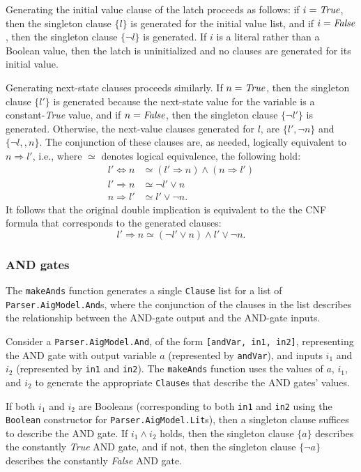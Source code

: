 \documentclass[12pt,a4paper,twoside,openright]{report}
\begin{document}
{Generating the initial value clause of the latch proceeds as follows: if $i = {\it True}$,
then the singleton clause $\{l\}$ is generated for the initial value list, and if $i = {\it False}$,
then the singleton clause $\{\neg l\}$ is generated.
If $i$ is a literal rather than a Boolean value, then the latch is
uninitialized and no clauses are generated for its initial value.

Generating next-state clauses proceeds similarly. If $n = {\it True}$, then the singleton clause
$\{l'\}$ is generated because the next-state value for the variable is a constant-{\it True} value,
and if $n = {\it False}$, then the singleton clause $\{\neg l'\}$ is generated.
Otherwise, the next-value clauses generated for $l$, are $\{l', \neg n\}$
and $\{\neg l,, n\}$. The conjunction of these clauses are, as needed, logically equivalent
to $n \Rightarrow l'$, i.e., where $\simeq$ denotes logical equivalence,
the following hold:
\begin{align*}
l' \Leftrightarrow n &\simeq (l' \Rightarrow n) \wedge (n \Rightarrow l')\\
l' \Rightarrow n &\simeq \neg l' \vee n\\
n \Rightarrow l' &\simeq l' \vee \neg n.
\end{align*}
It follows that the original double implication is equivalent to the 
the CNF formula that corresponds to the generated clauses:
$$l' \Rightarrow n \simeq (\neg l' \vee n) \wedge l' \vee \neg n.$$

\subsubsection{AND gates}
The \verb,makeAnds, function generates a single \verb,Clause, list for a list of \verb,Parser.AigModel.And,s,
where the conjunction of the clauses in the list describes the relationship between the AND-gate output
and the AND-gate inputs.

Consider a \verb,Parser.AigModel.And,, of the form \verb.[andVar, in1, in2]., representing the AND gate
with output variable $a$ (represented by \verb,andVar,), and inputs $i_1$ and $i_2$ (represented by \verb,in1,
and \verb,in2,). The \verb,makeAnds, function uses the values of $a$, $i_1$, and $i_2$ to generate the appropriate
\verb,Clause,s that describe the AND gates' values.

If both $i_1$ and $i_2$ are Booleans (corresponding to both \verb,in1, and \verb,in2, using the \verb,Boolean,
constructor for \verb,Parser.AigModel.Lit,s), then a singleton clause suffices to describe the AND gate.
If $i_1 \wedge i_2$ holds, then the singleton clause $\{a\}$ describes the constantly {\it True} AND gate,
and if not, then the singleton clause $\{\neg a\}$ describes the constantly {\it False} AND gate.

}
\end{document}
